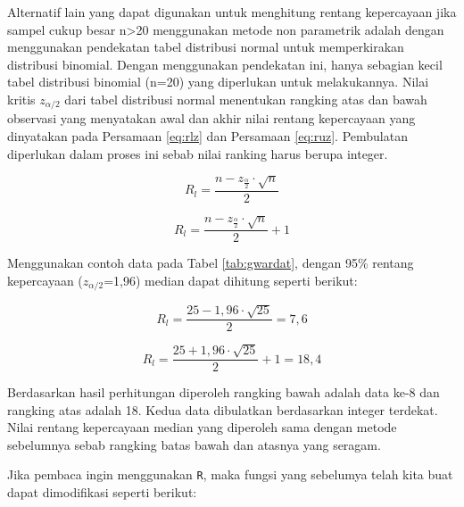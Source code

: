 \documentclass[]{book}
\begin{document}
Alternatif lain yang dapat digunakan untuk menghitung rentang
kepercayaan jika sampel cukup besar n\textgreater{}20 menggunakan metode
non parametrik adalah dengan menggunakan pendekatan tabel distribusi
normal untuk memperkirakan distribusi binomial. Dengan menggunakan
pendekatan ini, hanya sebagian kecil tabel distribusi binomial (n=20)
yang diperlukan untuk melakukannya. Nilai kritis \(z_{\alpha/2}\) dari
tabel distribusi normal menentukan rangking atas dan bawah observasi
yang menyatakan awal dan akhir nilai rentang kepercayaan yang dinyatakan
pada Persamaan \eqref{eq:rlz} dan Persamaan \eqref{eq:ruz}. Pembulatan
diperlukan dalam proses ini sebab nilai ranking harus berupa integer.

\begin{equation}
  R_l=\frac{n-z_{\frac{\alpha}{2}}\cdot\sqrt{n}}{2} 
  \label{eq:rlz}
\end{equation}

\begin{equation}
   R_l=\frac{n-z_{\frac{\alpha}{2}}\cdot\sqrt{n}}{2}+1
  \label{eq:ruz}
\end{equation}

Menggunakan contoh data pada Tabel \ref{tab:gwardat}, dengan 95\%
rentang kepercayaan (\(z_{\alpha/2}\)=1,96) median dapat dihitung
seperti berikut:

\begin{equation}
  R_l=\frac{25-1,96\cdot\sqrt{25}}{2}=7,6 
\end{equation}

\begin{equation}
  R_l=\frac{25+1,96\cdot\sqrt{25}}{2}+1=18,4 
\end{equation}

Berdasarkan hasil perhitungan diperoleh rangking bawah adalah data ke-8
dan rangking atas adalah 18. Kedua data dibulatkan berdasarkan integer
terdekat. Nilai rentang kepercayaan median yang diperoleh sama dengan
metode sebelumnya sebab rangking batas bawah dan atasnya yang seragam.

Jika pembaca ingin menggunakan \texttt{R}, maka fungsi yang sebelumya
telah kita buat dapat dimodifikasi seperti berikut:
\end{document}

